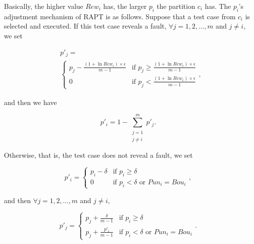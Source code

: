 \documentclass[10pt,journal,compsoc]{IEEEtran}
\begin{document}
Basically, the higher value $Rew_i$ has, the larger $p_i$ the partition $c_i$ has. The $p_i$'s adjustment mechanism of RAPT is as follows. Suppose that a test case from $c_i$ is selected and executed. If this test case reveals a fault, $\forall j = 1, 2, \ldots, m$ and $j \neq i$, we set

\begin{equation}
\label{eq:RAPThitJ}
\begin{split}
& p'_j = \\
& \begin{cases}
p_j - \displaystyle\frac{(1 + \ln Rew_i) \times \epsilon}{m-1} & \text{if } p_j \geq \displaystyle\frac{(1 + \ln Rew_i) \times \epsilon}{m-1} \\
0 & \text{if } p_j < \displaystyle\frac{(1 + \ln Rew_i) \times \epsilon}{m-1}
\end{cases},
\end{split}
\end{equation}

and then we have

\begin{equation}
\label{eq:RAPThitI}
p'_i = 1 - \sum_{\substack{j = 1 \\ j \neq i}}^m p'_j.
\end{equation}

Otherwise, that is, the test case does not reveal a fault, we set

\begin{equation}
\label{eq:RAPTmissI}
p'_i =
\begin{cases}
p_i - \delta & \text{if } p_i \geq \delta \\
0 & \text{if } p_i < \delta \text{ or } Pun_i = Bou_i
\end{cases},
\end{equation}

and then $\forall j = 1, 2, \ldots, m$ and $j \neq i$,

\begin{equation}
\label{eq:RAPTmissJ}
p'_j =
\begin{cases}
p_j + \displaystyle\frac{\delta}{m-1} & \text{if } p_i \geq \delta \\
p_j + \displaystyle\frac{p'_i}{m-1} & \text{if } p_i < \delta \text{ or } Pun_i = Bou_i
\end{cases}.
\end{equation}
\end{document}
